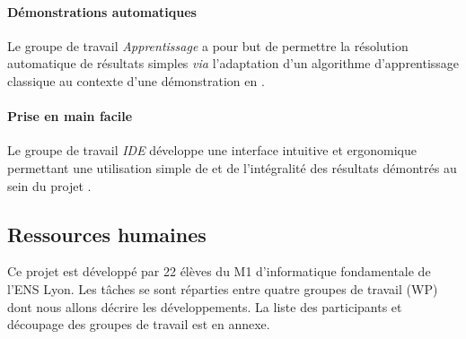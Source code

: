 \paragraph{Démonstrations automatiques} Le groupe de travail \emph{Apprentissage} a pour but de permettre la résolution automatique de résultats simples \emph{via} l'adaptation d'un algorithme d'apprentissage classique au contexte d'une démonstration en \coq{}.

\paragraph{Prise en main facile} Le groupe de travail \emph{IDE} développe une interface intuitive et ergonomique permettant une utilisation simple de \coq{} et de l'intégralité des résultats démontrés au sein du projet \coquille{}.

\subsection{Ressources humaines}

Ce projet est développé par 22 élèves du M1 d'informatique fondamentale de l'ENS Lyon. Les tâches se sont réparties entre quatre groupes de travail (WP) dont nous allons décrire les développements. La liste des participants et découpage des groupes de travail est en annexe.
